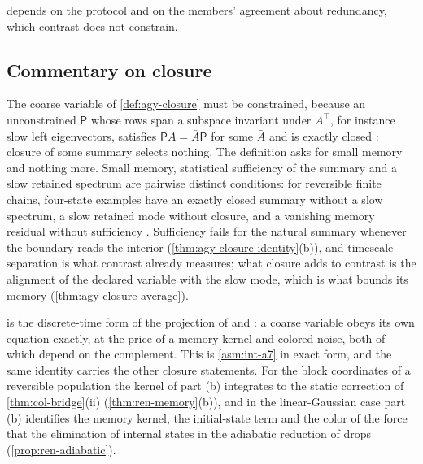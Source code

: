 \begin{remark}
depends on the protocol and on the members' agreement about redundancy, which contrast does not constrain.
\end{remark}

\subsection{Commentary on closure}\label{sup:agy-commentary-on-closure}

The coarse variable of \cref{def:agy-closure} must be constrained, because an unconstrained $\mathsf P$ whose rows span a subspace invariant under $A^\top$, for instance slow left eigenvectors, satisfies $\mathsf PA=\bar A\mathsf P$ for some $\bar A$ and is exactly closed \citep{dennis2026communicating}: closure of some summary selects nothing. The definition asks for small memory and nothing more. Small memory, statistical sufficiency of the summary and a slow retained spectrum are pairwise distinct conditions: for reversible finite chains, four-state examples have an exactly closed summary without a slow spectrum, a slow retained mode without closure, and a vanishing memory residual without sufficiency \citep{dennis2026participatory}. Sufficiency fails for the natural summary whenever the boundary reads the interior (\cref{thm:agy-closure-identity}(b)), and timescale separation is what contrast already measures; what closure adds to contrast is the alignment of the declared variable with the slow mode, which is what bounds its memory (\cref{thm:agy-closure-average}).

 is the discrete-time form of the projection of \citet{zwanzig1961memory} and \citet{mori1965transport}: a coarse variable obeys its own equation exactly, at the price of a memory kernel and colored noise, both of which depend on the complement. This is \cref{asm:int-a7} in exact form, and the same identity carries the other closure statements. For the block coordinates of a reversible population the kernel of part (b) integrates to the static correction of \cref{thm:col-bridge}(ii) (\cref{thm:ren-memory}(b)), and in the linear-Gaussian case part (b) identifies the memory kernel, the initial-state term and the color of the force that the elimination of internal states in the adiabatic reduction of \citet{friston2019free} drops (\cref{prop:ren-adiabatic}).

